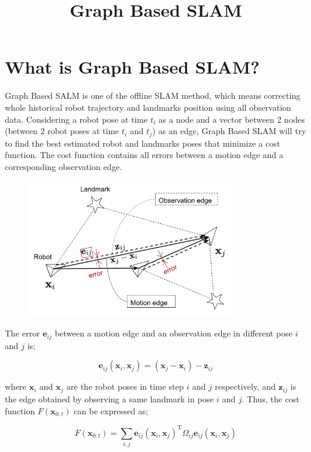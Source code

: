 \documentclass{article}
\title{Graph Based SLAM}
\date{}
\author{}
\begin{document}
\maketitle

\section{What is Graph Based SLAM?}

Graph Based SALM is one of the offline SLAM method, which means correcting whole historical robot trajectory and landmarks position using all observation data.
Considering a robot pose at time $t_i$ as a node and a vector between 2 nodes (between 2 robot poses at time $t_i$ and $t_j$) as an edge, Graph Based SLAM will try to find the best estimated robot and landmarks poses that minimize a cost function.
The cost function contains all errors between a motion edge and a corresponding observation edge.

\begin{figure}[h!]
  \centering
  \includegraphics[width=0.8\textwidth]{1-1_error_between_edges.png}
\end{figure}

The error $\bm{e}_{ij}$ between a motion edge and an observation edge in different pose $i$ and $j$ is;

\[
\bm{e}_{ij}(\bm{x}_i, \bm{x}_j) = (\bm{x}_j - \bm{x}_i) - \bm{z}_{ij}
\]

where $\bm{x}_i$ and $\bm{x}_j$ are the robot poses in time step $i$ and $j$ respectively, and $\bm{z}_{ij}$ is the edge obtained by observing a same landmark in pose $i$ and $j$.
Thus, the cost function $F(\bm{x}_{0:t})$ can be expressed as;

\[
F(\bm{x}_{0:t}) = \sum_{i,j} \bm{e}_{ij}(\bm{x}_i, \bm{x}_j)^{\mathrm{T}} \Omega_{ij} \bm{e}_{ij}(\bm{x}_i, \bm{x}_j)
\]
\end{document}
